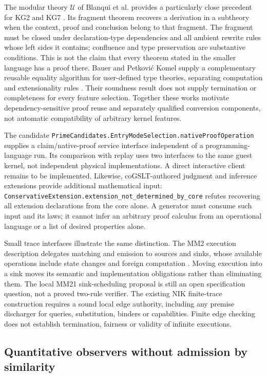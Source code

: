 \documentclass[11pt]{article}
\theoremstyle{definition}
\theoremstyle{remark}
\begin{document}
The modular theory $\mathcal U$ of Blanqui et al. provides a particularly close
precedent for KG2 and KG7 \cite{BlanquiModularTypeTheories}. Its fragment theorem
recovers a derivation in a subtheory when the context, proof and conclusion
belong to that fragment. The fragment must be closed under declaration-type
dependencies and all ambient rewrite rules whose left sides it contains;
confluence and type preservation are substantive conditions. This is not the
claim that every theorem stated in the smaller language has a proof there.
Bauer and Petkovi\'c Komel supply a complementary reusable equality algorithm
for user-defined type theories, separating computation and extensionality rules
\cite{BauerPetkovicEquality}. Their soundness result does not supply termination
or completeness for every feature selection. Together these works motivate
dependency-sensitive proof reuse and separately qualified conversion components,
not automatic compatibility of arbitrary kernel features.

The candidate \nolinkurl{PrimeCandidates.EntryModeSelection.nativeProofOperation}
supplies a claim/native-proof service interface independent of a
programming-language run. Its comparison with replay uses two interfaces to
the same guest kernel, not independent physical implementations. A direct
interactive client remains to be implemented. Likewise, coGSLT-authored
judgment and inference extensions provide additional mathematical input:
\nolinkurl{ConservativeExtension.extension_not_determined_by_core} refutes
recovering all extension declarations from the core alone. A generator must
consume such input and its laws; it cannot infer an arbitrary proof calculus
from an operational language or a list of desired properties alone.

Small trace interfaces illustrate the same distinction. The MM2 execution
description delegates matching and emission to sources and sinks, whose
available operations include state changes and foreign computation
\cite{MORKMM2,MORKSourcesSinks}. Moving execution into a sink moves its semantic
and implementation obligations rather than eliminating them. The local MM21
sink-scheduling proposal is still an open specification question, not a proved
two-rule verifier. The existing NIK finite-trace construction requires a sound
local edge authority, including any premise discharger for queries,
substitution, binders or capabilities. Finite edge checking does not establish
termination, fairness or validity of infinite executions.

\subsection{Quantitative observers without admission by similarity}
\label{sec:distinction-calculus}
\end{document}
